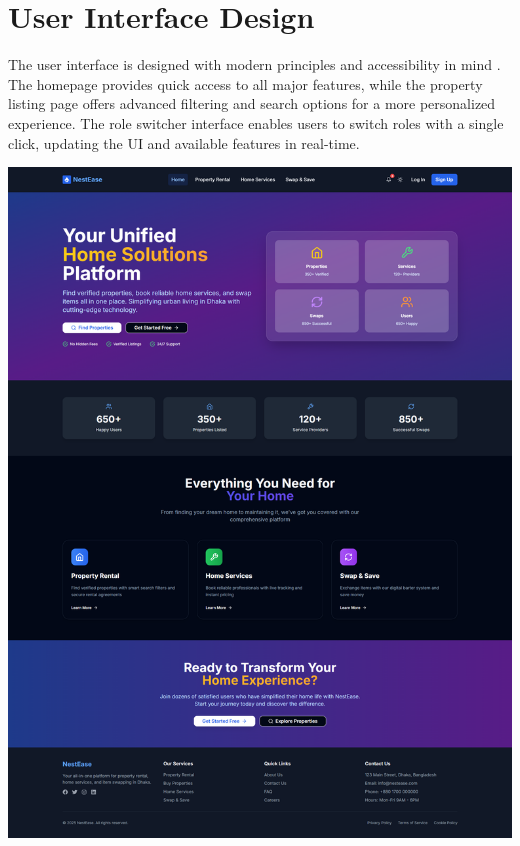 \documentclass[conference]{IEEEtran}
\begin{document}
\section{User Interface Design}
The user interface is designed with modern principles and accessibility in mind \cite{user_experience}. The homepage provides quick access to all major features, while the property listing page offers advanced filtering and search options for a more personalized experience. The role switcher interface enables users to switch roles with a single click, updating the UI and available features in real-time.

\begin{center}
\setlength{\parskip}{12pt}

\noindent
\begin{minipage}[t]{0.45\textwidth}
\includegraphics[width=\linewidth]{Project Screenshot/HomePage.png}
\end{minipage} \hfill

\end{center}
\end{document}
